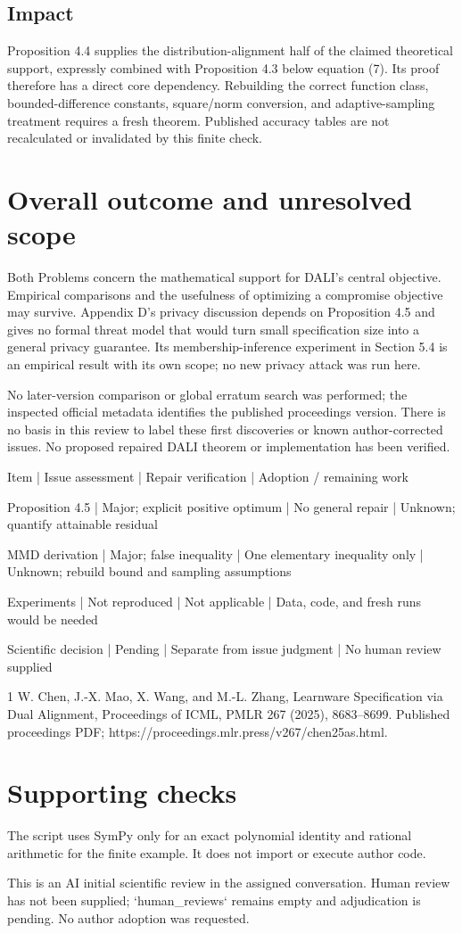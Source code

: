 \documentclass[10pt]{article}
\begin{document}
\subsection*{Impact}
Proposition 4.4 supplies the distribution-alignment half of the claimed theoretical support, expressly combined with Proposition 4.3 below equation (7). Its proof therefore has a direct core dependency. Rebuilding the correct function class, bounded-difference constants, square/norm conversion, and adaptive-sampling treatment requires a fresh theorem. Published accuracy tables are not recalculated or invalidated by this finite check.\par
\section*{Overall outcome and unresolved scope}
Both Problems concern the mathematical support for DALI’s central objective. Empirical comparisons and the usefulness of optimizing a compromise objective may survive. Appendix D’s privacy discussion depends on Proposition 4.5 and gives no formal threat model that would turn small specification size into a general privacy guarantee. Its membership-inference experiment in Section 5.4 is an empirical result with its own scope; no new privacy attack was run here.\par
No later-version comparison or global erratum search was performed; the inspected official metadata identifies the published proceedings version. There is no basis in this review to label these first discoveries or known author-corrected issues. No proposed repaired DALI theorem or implementation has been verified.\par
Item | Issue assessment | Repair verification | Adoption / remaining work\par
Proposition 4.5 | Major; explicit positive optimum | No general repair | Unknown; quantify attainable residual\par
MMD derivation | Major; false inequality | One elementary inequality only | Unknown; rebuild bound and sampling assumptions\par
Experiments | Not reproduced | Not applicable | Data, code, and fresh runs would be needed\par
Scientific decision | Pending | Separate from issue judgment | No human review supplied\par
1 W. Chen, J.-X. Mao, X. Wang, and M.-L. Zhang, Learnware Specification via Dual Alignment, Proceedings of ICML, PMLR 267 (2025), 8683–8699. Published proceedings PDF; https://proceedings.mlr.press/v267/chen25as.html.\par
\section*{Supporting checks}
The script uses SymPy only for an exact polynomial identity and rational arithmetic for the finite example. It does not import or execute author code.\par
This is an AI initial scientific review in the assigned conversation. Human review has not been supplied; `human\_reviews` remains empty and adjudication is pending. No author adoption was requested.\par
\end{document}
